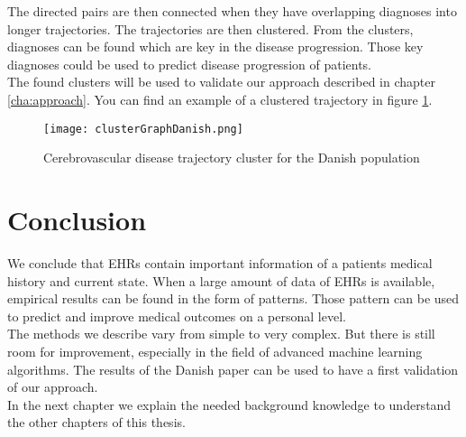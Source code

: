 The directed pairs are then connected when they have overlapping diagnoses into longer trajectories. The trajectories are then clustered. From the clusters, diagnoses can be found which are key in the disease progression. Those key diagnoses could be used to predict disease progression of patients. \\

The found clusters will be used to validate our approach described in chapter \ref{cha:approach}. You can find an example of a clustered trajectory in figure \ref{fig:clusterGraphDanish}.

\begin{figure}[H]
	\centering
	\texttt{[image: clusterGraphDanish.png]}
	\caption{Cerebrovascular disease trajectory cluster for the Danish population \cite{Brunak:article}}
	\label{fig:clusterGraphDanish}
\end{figure}


\section{Conclusion}

We conclude that EHRs contain important information of a patients medical history and current state. When a large amount of data of EHRs is available, empirical results can be found in the form of patterns. Those pattern can be used to predict and improve medical outcomes on a personal level. \\
The methods we describe vary from simple to very complex. But there is still room for improvement, especially in the field of advanced machine learning algorithms. The results of the Danish paper can be used to have a first validation of our approach. \\

In the next chapter we explain the needed background knowledge to understand the other chapters of this thesis.


